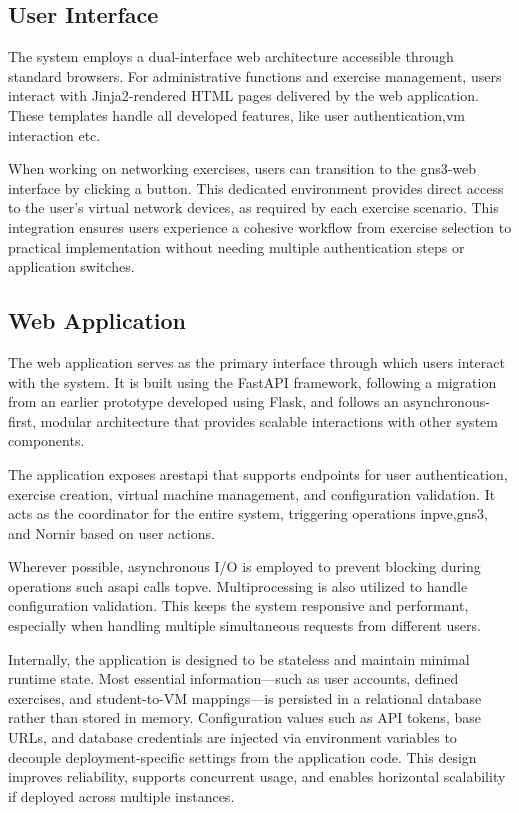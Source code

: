     \subsection{User Interface}
        The system employs a dual-interface web architecture accessible through standard browsers. For administrative functions and exercise management, 
        users interact with Jinja2-rendered HTML pages delivered by the web application. These templates handle all developed features, like user 
        authentication,\ac{vm} interaction etc.

        When working on networking exercises, users can transition to the \ac{gns3}-web interface by clicking a button. This dedicated environment 
        provides direct access to the user's virtual network devices, as required by each exercise scenario. This integration ensures users experience 
        a cohesive workflow from exercise selection to practical implementation without needing multiple authentication steps or application switches.

    \subsection{Web Application}

        The web application serves as the primary interface through which users interact with the system. It is built using the FastAPI 
        framework, following a migration from an earlier prototype developed using Flask, and follows an asynchronous-first, modular 
        architecture that provides scalable interactions with other system components.

        The application exposes a\ac{rest}\ac{api} that supports endpoints for user authentication, exercise creation, virtual 
        machine management, and configuration validation. It acts as the coordinator for the entire system, triggering operations 
        in\ac{pve},\ac{gns3}, and Nornir based on user actions.

        Wherever possible, asynchronous I/O is employed to prevent blocking during operations such as\ac{api} calls to\ac{pve}.
        Multiprocessing is also utilized to handle configuration validation. This keeps the system responsive and performant, 
        especially when handling multiple simultaneous requests from different users.

        Internally, the application is designed to be stateless and maintain minimal runtime state.  Most essential information—such 
        as user accounts, defined exercises, and student-to-VM mappings—is persisted in a relational database rather than stored in 
        memory. Configuration values such as API tokens, base URLs, and database credentials are injected via environment variables 
        to decouple deployment-specific settings from the application code. This design improves reliability, supports concurrent 
        usage, and enables horizontal scalability if deployed across multiple instances. 

